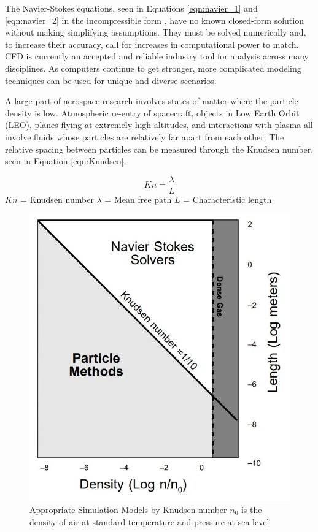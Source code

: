 \indent The Navier-Stokes equations, seen in Equations \ref{eqn:navier_1} and \ref{eqn:navier_2} in the incompressible form \cite{navier_eqns}, have no known closed-form solution without making simplifying assumptions. They must be solved numerically and, to increase their accuracy, call for increases in computational power to match. CFD is currently an accepted and reliable industry tool for analysis across many disciplines. As computers continue to get stronger, more complicated modeling techniques can be used for unique and diverse scenarios. \par

\indent A large part of aerospace research involves states of matter where the particle density is low. Atmospheric re-entry of spacecraft, objects in Low Earth Orbit (LEO), planes flying at extremely high altitudes, and interactions with plasma all involve fluids whose particles are relatively far apart from each other. The relative spacing between particles can be measured through the Knudsen number, seen in Equation \ref{eqn:Knudsen}. \par

\begin{equation}
    \label{eqn:Knudsen}
    Kn = \frac{\lambda}{L}
\end{equation}
\(Kn\) = Knudsen number \newline
\(\lambda\) = Mean free path \newline
\(L\) = Characteristic length \par


\begin{figure}
    \includegraphics[width=.55\textwidth]{figures/navier.JPG}
    \centering
    \caption[Appropriate Simulation Models by Knudsen number]{Appropriate Simulation Models by Knudsen number \cite{navier} \(n_0\) is the density of air at standard temperature and pressure at sea level}
    \label{fig:navier}
\end{figure}


